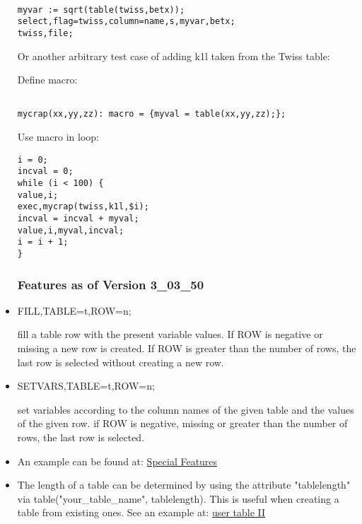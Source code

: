 \begin{itemize}
\begin{verbatim}

myvar := sqrt(table(twiss,betx));
select,flag=twiss,column=name,s,myvar,betx;
twiss,file;
\end{verbatim}

 Or another arbitrary test case of adding k1l taken from the Twiss table: 

 Define macro: 


\begin{verbatim}

mycrap(xx,yy,zz): macro = {myval = table(xx,yy,zz);};
\end{verbatim}

 Use macro in loop: 


\begin{verbatim}
i = 0;
incval = 0;
while (i < 100) {
value,i;
exec,mycrap(twiss,k1l,$i);
incval = incval + myval;
value,i,myval,incval;                
i = i + 1;
}
\end{verbatim}

\subsubsection{Features as of Version 3\_03\_50}
	\item 

 FILL,TABLE=t,ROW=n; 

 fill a table row with the present variable values. If ROW is negative or missing a new row is created. If ROW is greater than the number of rows, the last row is selected without creating a new row. 


	\item    SETVARS,TABLE=t,ROW=n; 

 set variables according to the column names of the given table and the values of the given row. if ROW is negative, missing or greater than the number of rows, the last row is selected. 


	\item  An example can be found at: \href{http://cern.ch/frs/mad-X_examples/special_features}{Special Features}


	\item  The length of a table can be determined by using the attribute "tablelength" via table("your\_table\_name", tablelength). This is useful when creating a table from existing ones. See an example at: \href{../Introduction/select.html#screate}{user table II}


\end{itemize}

